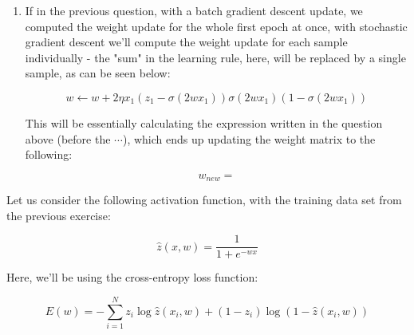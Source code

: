 \documentclass[12pt]{article}
\begin{document}
\begin{enumerate}[leftmargin=\labelsep]
\begin{enumerate}
{          \begin{align*}
            w & \leftarrow w + 2 \eta \sum_{i=1}^N x_i (z_i - \sigma(2wx_i)) \sigma(2wx_i) (1 - \sigma(2wx_i))) \\
              & \leftarrow  + 2 \cdot 1 \cdot
            \left(
             \cdot \left(
              1 - \sigma(2 \cdot  \cdot )
              \right) \cdot \sigma(2 \cdot  \cdot ) \cdot
            \left(1 - \sigma(2 \cdot  \cdot )\right)
            + \cdots \right) = 
          \end{align*}

          }
    \item {
          If in the previous question, with a batch gradient descent update, we
          computed the weight update for the whole first epoch at once, with
          stochastic gradient descent we'll compute the weight update for each
          sample individually - the "sum" in the learning rule, here, will be replaced
          by a single sample, as can be seen below:

          $$
            w \leftarrow w + 2\eta x_1 (z_1 - \sigma(2wx_1)) \sigma(2wx_1) (1 - \sigma(2wx_1))
          $$

          This will be essentially calculating the expression written in the question above
          (before the $\cdots$), which ends up updating the weight matrix to the following:

          $$
            w_{new} = 
          $$
          }
  \end{enumerate}

  \begin{tcolorbox}[enhanced jigsaw,colback=bg,boxrule=0pt,arc=1pt,halign=center]
    \item Let us consider the following activation function, with the training data set
    from the previous exercise:

    \begin{equation*}
      \hat{z}(x, w) = \frac{1}{1 + e^{-w x}}
    \end{equation*}

    Here, we'll be using the cross-entropy loss function:

    \begin{equation*}
      E(w) = - \sum_{i=1}^N z_i \log \hat{z}(x_i, w) + (1 - z_i) \log (1 - \hat{z}(x_i, w))
    \end{equation*}


\end{tcolorbox}
\end{enumerate}
\end{document}
